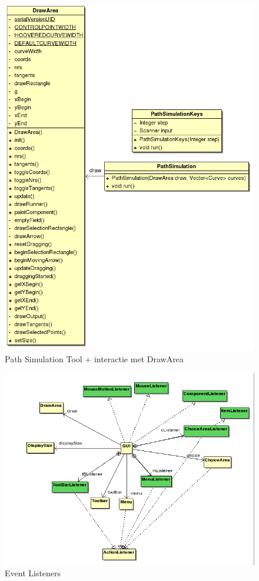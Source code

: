 \documentclass[a4paper,11pt,oneside, titlepage]{article}
\begin{document}
\begin{figure}[htbp]
\centering
\includegraphics[scale=0.4]{./UML2/Path.png}
\caption{Path Simulation Tool + interactie met DrawArea}\label{iTools}
\end{figure}
\begin{figure}[htbp]
\centering
\includegraphics[scale=0.4]{./UML2/Listeners.png}
\caption{Event Listeners}\label{iLis}
\end{figure}
\newpage
\end{document}
